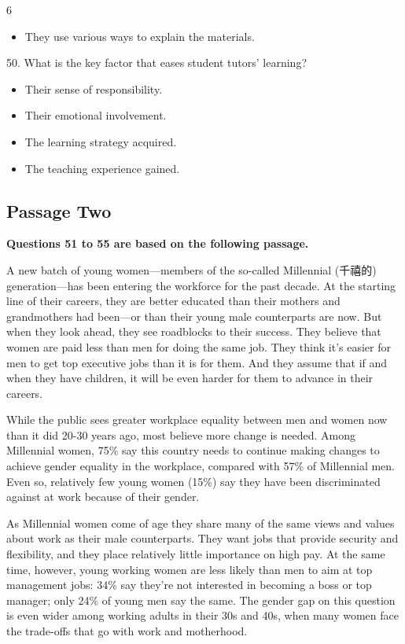 \documentclass[UTF8,11pt]{ctexart}
\begin{document}
6


\begin{itemize}[leftmargin=2em,itemsep=.2em,topsep=.4em]\item[D.] They use various ways to explain the materials.
\end{itemize}

50. What is the key factor that eases student tutors' learning?


\begin{itemize}[leftmargin=2em,itemsep=.2em,topsep=.4em]\item[A.] Their sense of responsibility.
\item[B.] Their emotional involvement.
\item[C.] The learning strategy acquired.
\item[D.] The teaching experience gained.
\end{itemize}

\subsection*{\textbf{Passage Two}}


\textbf{Questions 51 to 55 are based on the following passage.}


A new batch of young women—members of the so-called Millennial (千禧的) generation—has been entering the workforce for the past decade. At the starting line of their careers, they are better educated than their mothers and grandmothers had been—or than their young male counterparts are now. But when they look ahead, they see roadblocks to their success. They believe that women are paid less than men for doing the same job. They think it's easier for men to get top executive jobs than it is for them. And they assume that if and when they have children, it will be even harder for them to advance in their careers.


While the public sees greater workplace equality between men and women now than it did 20-30 years ago, most believe more change is needed. Among Millennial women, 75\% say this country needs to continue making changes to achieve gender equality in the workplace, compared with 57\% of Millennial men. Even so, relatively few young women (15\%) say they have been discriminated against at work because of their gender.


As Millennial women come of age they share many of the same views and values about work as their male counterparts. They want jobs that provide security and flexibility, and they place relatively little importance on high pay. At the same time, however, young working women are less likely than men to aim at top management jobs: 34\% say they're not interested in becoming a boss or top manager; only 24\% of young men say the same. The gender gap on this question is even wider among working adults in their 30s and 40s, when many women face the trade-offs that go with work and motherhood.
\end{document}
